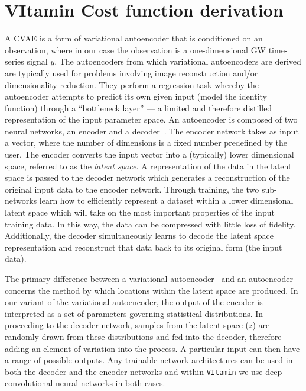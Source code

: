 %
%
\section{VItamin Cost function derivation}
A \ac{CVAE} is a form of variational autoencoder that is
conditioned on an observation, where in our case the observation is a
one-dimensional \ac{GW} time-series signal $y$. The autoencoders from which
variational autoencoders are derived are typically used for problems involving
image reconstruction and/or dimensionality reduction. They perform a regression
task whereby the autoencoder attempts to predict its own given input (model the
identity function) through a ``bottleneck layer'' --- a limited  and therefore
distilled representation of the input parameter space. An autoencoder is
composed of two neural networks, an encoder and a
decoder~\cite{gallinari1987memoires}.  The encoder network takes as input a
vector, where the number of dimensions is a fixed number predefined by the
user. The encoder converts the input vector into a (typically) lower
dimensional space, referred to as the {\it{latent space}}. A representation of
the data in the latent space is passed to the decoder network which generates a
reconstruction of the original input data to the encoder network. Through
training, the two sub-networks learn how to efficiently represent a dataset
within a lower dimensional latent space which will take on the most important
properties of the input training data. In this way, the data can be compressed
with little loss of fidelity. Additionally, the decoder simultaneously learns
to decode the latent space representation and reconstruct that data back to its
original form (the input data).

%
%
The primary difference between a variational autoencoder~\cite{1812.04405} and
an autoencoder concerns the method by which locations within the latent space
are produced. In our variant of the variational autoencoder, the output of the
encoder is interpreted as a set of parameters governing statistical
distributions. In proceeding to the decoder network, samples from the latent
space ($z$) are randomly drawn from these distributions and fed into the
decoder, therefore adding an element of variation into the process. A
particular input can then have a range of possible outputs. Any trainable
network architectures can be used in both the decoder and the encoder networks
and within \texttt{VItamin} we use deep convolutional neural networks in both
cases.


